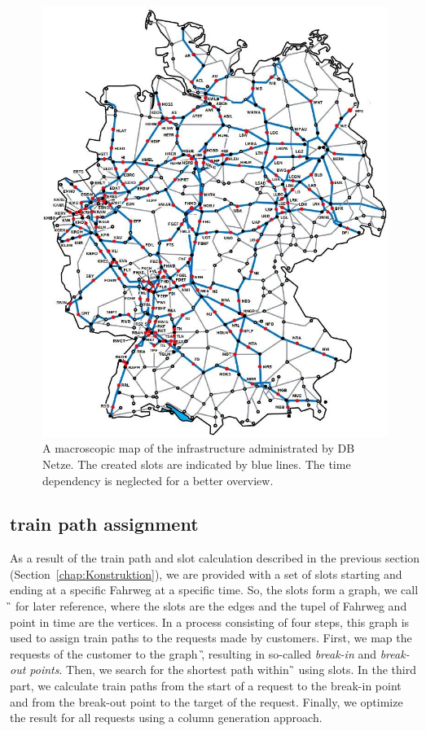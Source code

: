 %
\begin{figure}[tb]
	\centering
	\includegraphics[scale=0.40]{Bilder/STA-Karte.jpg}
	\caption{A macroscopic map of the infrastructure administrated by DB Netze. The created slots are indicated by blue lines. The time dependency is neglected for a better overview.}
	\label{fig:STAKarte}
\end{figure}


\subsection{train path assignment}
\label{chap:Belegung}
%
As a result of the train path and slot calculation described in the previous section (Section~\ref{chap:Konstruktion}), we are provided with a set of slots starting and ending at a specific Fahrweg at a specific time. So, the slots form a graph, we call \G\, for later reference, where the slots are the edges and the tupel of Fahrweg and point in time are the vertices. In a process consisting of four steps, this graph is used to assign train paths to the requests made by customers. First, we map the requests of the customer to the graph \G, resulting in so-called \emph{break-in} and \emph{break-out points}. Then, we search for the shortest path within \G\, using slots. In the third part, we calculate train paths from the start of a request to the break-in point and from the break-out point to the target of the request. Finally, we optimize the result for all requests using a column generation approach.

